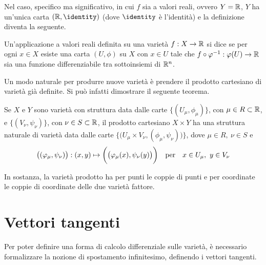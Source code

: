 Nel caso, specifico ma significativo, in cui $f$ sia a valori reali, ovvero $Y = \mathbb{R}$, $Y$ ha un'unica carta $(\R, \identity)$ (dove $\identity$ è l'identità) e la definizione diventa la seguente.
\begin{definition}
  Un'applicazione a valori reali definita su una varietà $f:X\to \mathbb{R}$ si dice  se per ogni $x \in X$ esiste una carta $(U, \phi)$ su $X$ con $x \in  U$ tale che $f\circ \varphi^{-1}: \varphi(U) \to \mathbb{R}$ sia una funzione differenziabile tra sottoinsiemi di $\mathbb{R}^{n}$.
\end{definition}

Un modo naturale per produrre nuove varietà è prendere il prodotto cartesiano di varietà già definite. Si può infatti dimostrare il seguente teorema.
\begin{theorem}
  Se $X$ e $Y$ sono varietà con struttura data dalle carte $\big\lbrace(U_{\mu}, \phi_{\mu})\big\rbrace$, con $\mu \in R \subset \mathbb{R}$, e $\big\lbrace (V_{\nu}, \psi_{\nu})\big\rbrace$, con $\nu \in S \subset  \mathbb{R}$, il prodotto cartesiano $X \times Y$ ha una struttura naturale di varietà data dalle carte $\Big\lbrace\big( U_{\mu} \times V_{\nu}, (\phi_{\mu},\psi_{\nu})\big)\Big\rbrace$, dove $\mu \in  R,\ \nu \in S$ e \begin{equation*}
    \big((\phi_{\mu},\psi_{\nu})\big): (x,y) \mapsto \bigg(\big(\phi_{\mu}(x),\psi_{\nu}(y)\big)\bigg) \qqtext{per} x \in U_{\mu},\ y \in  V_{\nu}
  \end{equation*} 
\end{theorem}
\begin{remark}
  In sostanza, la varietà prodotto ha per punti le coppie di punti e per coordinate le coppie di coordinate delle due varietà fattore.
\end{remark}

\section{Vettori tangenti}
Per poter definire una forma di calcolo differenziale sulle varietà, è necessario formalizzare la nozione di spostamento infinitesimo, definendo i vettori tangenti.

